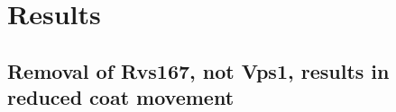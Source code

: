 \documentclass[9pt,lineno]{elife}
\begin{document}

%

\section{Results}

\subsection{Removal of Rvs167, not Vps1,  results in reduced coat movement}
\end{document}
